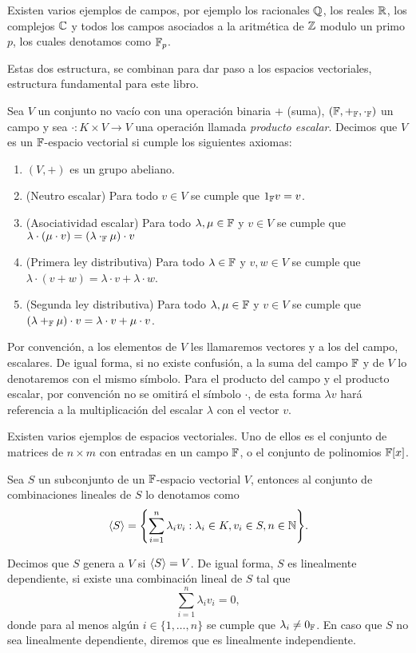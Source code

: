 Existen varios ejemplos de campos, por ejemplo los racionales $\mathbb{Q}$, los reales $\mathbb{R}$, los complejos $\mathbb{C}$ y todos los campos asociados a la aritmética de $\mathbb{Z}$ modulo un primo $p$, los cuales denotamos como $\mathbb{F}_p$.

Estas dos estructura, se combinan para dar paso a los espacios vectoriales, estructura fundamental para este libro.

\begin{defi}
  Sea $V$ un conjunto no vacío con una operación binaria $+$ (suma), $(\mathbb{F}, +_{\mathbb{F}}, \cdot_{\mathbb{F}} )$ un campo y sea $\cdot\colon K \times V \to V$ una operación llamada \emph{producto escalar}. Decimos que $V$ es un $\mathbb{F}$-espacio vectorial si cumple los siguientes axiomas:
  \begin{enumerate}
    \item $(V, +)$ es un grupo abeliano.
    \item (Neutro escalar) Para todo $v \in V$ se cumple que $1_{\mathbb{F}} v = v$.
    \item (Asociatividad escalar) Para todo $\lambda, \mu \in \mathbb{F}$ y $v \in V$ se cumple que $\lambda \cdot (\mu \cdot v) = (\lambda \cdot_{\mathbb{F}} \mu)  \cdot v$
    \item (Primera ley distributiva) Para todo $\lambda \in \mathbb{F}$ y $v,w \in V$ se cumple que $\lambda \cdot (v + w) = \lambda \cdot v + \lambda \cdot w$.
    \item (Segunda ley distributiva) Para todo $\lambda, \mu \in \mathbb{F}$ y $v\in V$ se cumple que $(\lambda +_{\mathbb{F}} \mu)\cdot v = \lambda \cdot v + \mu \cdot v$.
  \end{enumerate}
\end{defi}


Por convención, a los elementos de $V$ les llamaremos vectores y a los del campo, escalares. De igual forma, si no existe confusión, a la suma del campo $\mathbb{F}$ y de $V$ lo denotaremos con el mismo símbolo. Para el producto del campo y el producto escalar, por convención no se omitirá el símbolo $\cdot$, de esta forma $\lambda v$ hará referencia a la multiplicación del escalar $\lambda$ con el vector $v$.

Existen varios ejemplos de espacios vectoriales. Uno de ellos es el conjunto de matrices de $n \times m $ con entradas en un campo $\mathbb{F}$, o el conjunto de polinomios $\mathbb{F}[x]$.

\begin{defi}
  Sea $S$ un subconjunto de un $\mathbb{F}$-espacio vectorial $V$, entonces al conjunto de combinaciones lineales de $S$ lo denotamos como
  \[ \inner{S} = \set{ \sum_{i=1}^n \lambda_i v_i : \lambda_i \in K,  v_i \in S, n \in \N  }. \]

  Decimos que $S$ genera a $V$ si $\langle S\rangle = V$. De igual forma, $S$ es linealmente dependiente, si existe una combinación lineal de $S$ tal que
  \[ \sum_{i=1}^n \lambda_i v_i = 0, \]
  donde para al menos algún $i \in \{1,\ldots,n\}$ se cumple que $\lambda_i \neq 0_{\mathbb{F}}$. En caso que $S$ no sea linealmente dependiente, diremos que es linealmente independiente.
\end{defi}

